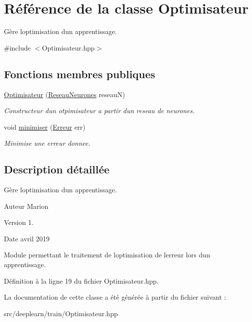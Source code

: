 \hypertarget{class_optimisateur}{}\section{Référence de la classe Optimisateur}
\label{class_optimisateur}


Gère l\textquotesingle{}optimisation d\textquotesingle{}un apprentissage.  




{\ttfamily \#include $<$Optimisateur.\+hpp$>$}

\subsection*{Fonctions membres publiques}
\begin{DoxyCompactItemize}
\item 
\mbox{\label{class_optimisateur_a6add3f8a05881c495701ced64cb7310e}} 
\hyperlink{class_optimisateur_a6add3f8a05881c495701ced64cb7310e}{Optimisateur} (\hyperlink{class_reseau_neurones}{Reseau\+Neurones} reseauN)
\begin{DoxyCompactList}\small\item\em Constructeur d\textquotesingle{}un otpimisateur a partir d\textquotesingle{}un reseau de neurones. \end{DoxyCompactList}\item 
\mbox{\label{class_optimisateur_a36f64c4672ec7694a06daad60715bd3a}} 
void \hyperlink{class_optimisateur_a36f64c4672ec7694a06daad60715bd3a}{minimiser} (\hyperlink{class_erreur}{Erreur} err)
\begin{DoxyCompactList}\small\item\em Minimise une erreur donnee. \end{DoxyCompactList}\end{DoxyCompactItemize}


\subsection{Description détaillée}
Gère l\textquotesingle{}optimisation d\textquotesingle{}un apprentissage. 

\begin{DoxyAuthor}{Auteur}
Marion 
\end{DoxyAuthor}
\begin{DoxyVersion}{Version}
1. 
\end{DoxyVersion}
\begin{DoxyDate}{Date}
avril 2019
\end{DoxyDate}
Module permettant le traitement de l\textquotesingle{}optimisation de l\textquotesingle{}erreur lors d\textquotesingle{}un apprentissage. 

Définition à la ligne 19 du fichier Optimisateur.\+hpp.



La documentation de cette classe a été générée à partir du fichier suivant \+:\begin{DoxyCompactItemize}
\item 
src/deeplearn/train/Optimisateur.\+hpp\end{DoxyCompactItemize}
